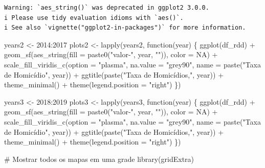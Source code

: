 \documentclass[
  letterpaper,
  DIV=11,
  numbers=noendperiod]{scrartcl}
\newenvironment{Shaded}{\begin{snugshade}}{\end{snugshade}}
\newcommand{\AttributeTok}[1]{\textcolor[rgb]{0.40,0.45,0.13}{#1}}
\newcommand{\CommentTok}[1]{\textcolor[rgb]{0.37,0.37,0.37}{#1}}
\newcommand{\ConstantTok}[1]{\textcolor[rgb]{0.56,0.35,0.01}{#1}}
\newcommand{\ControlFlowTok}[1]{\textcolor[rgb]{0.00,0.23,0.31}{#1}}
\newcommand{\DecValTok}[1]{\textcolor[rgb]{0.68,0.00,0.00}{#1}}
\newcommand{\FunctionTok}[1]{\textcolor[rgb]{0.28,0.35,0.67}{#1}}
\newcommand{\NormalTok}[1]{\textcolor[rgb]{0.00,0.23,0.31}{#1}}
\newcommand{\OtherTok}[1]{\textcolor[rgb]{0.00,0.23,0.31}{#1}}
\newcommand{\SpecialCharTok}[1]{\textcolor[rgb]{0.37,0.37,0.37}{#1}}
\newcommand{\StringTok}[1]{\textcolor[rgb]{0.13,0.47,0.30}{#1}}
\begin{document}
\begin{verbatim}
Warning: `aes_string()` was deprecated in ggplot2 3.0.0.
i Please use tidy evaluation idioms with `aes()`.
i See also `vignette("ggplot2-in-packages")` for more information.
\end{verbatim}

\begin{Shaded}
\begin{Highlighting}[]
\NormalTok{years2 }\OtherTok{\textless{}{-}} \DecValTok{2014}\SpecialCharTok{:}\DecValTok{2017}
\NormalTok{plots2 }\OtherTok{\textless{}{-}} \FunctionTok{lapply}\NormalTok{(years2, }\ControlFlowTok{function}\NormalTok{(year) \{}
  \FunctionTok{ggplot}\NormalTok{(df\_rdd) }\SpecialCharTok{+}
    \FunctionTok{geom\_sf}\NormalTok{(}\FunctionTok{aes\_string}\NormalTok{(}\AttributeTok{fill =} \FunctionTok{paste0}\NormalTok{(}\StringTok{"\textasciigrave{}valor{-}"}\NormalTok{, year, }\StringTok{"\textasciigrave{}"}\NormalTok{)), }\AttributeTok{color =} \ConstantTok{NA}\NormalTok{) }\SpecialCharTok{+}
    \FunctionTok{scale\_fill\_viridis\_c}\NormalTok{(}\AttributeTok{option =} \StringTok{"plasma"}\NormalTok{, }\AttributeTok{na.value =} \StringTok{"grey90"}\NormalTok{, }\AttributeTok{name =} \FunctionTok{paste}\NormalTok{(}\StringTok{"Taxa de Homicídio"}\NormalTok{, year)) }\SpecialCharTok{+}
    \FunctionTok{ggtitle}\NormalTok{(}\FunctionTok{paste}\NormalTok{(}\StringTok{"Taxa de Homicídios,"}\NormalTok{, year)) }\SpecialCharTok{+}
    \FunctionTok{theme\_minimal}\NormalTok{() }\SpecialCharTok{+}
    \FunctionTok{theme}\NormalTok{(}\AttributeTok{legend.position =} \StringTok{"right"}\NormalTok{)}
\NormalTok{\})}

\NormalTok{years3 }\OtherTok{\textless{}{-}} \DecValTok{2018}\SpecialCharTok{:}\DecValTok{2019}
\NormalTok{plots3 }\OtherTok{\textless{}{-}} \FunctionTok{lapply}\NormalTok{(years3, }\ControlFlowTok{function}\NormalTok{(year) \{}
  \FunctionTok{ggplot}\NormalTok{(df\_rdd) }\SpecialCharTok{+}
    \FunctionTok{geom\_sf}\NormalTok{(}\FunctionTok{aes\_string}\NormalTok{(}\AttributeTok{fill =} \FunctionTok{paste0}\NormalTok{(}\StringTok{"\textasciigrave{}valor{-}"}\NormalTok{, year, }\StringTok{"\textasciigrave{}"}\NormalTok{)), }\AttributeTok{color =} \ConstantTok{NA}\NormalTok{) }\SpecialCharTok{+}
    \FunctionTok{scale\_fill\_viridis\_c}\NormalTok{(}\AttributeTok{option =} \StringTok{"plasma"}\NormalTok{, }\AttributeTok{na.value =} \StringTok{"grey90"}\NormalTok{, }\AttributeTok{name =} \FunctionTok{paste}\NormalTok{(}\StringTok{"Taxa de Homicídio"}\NormalTok{, year)) }\SpecialCharTok{+}
    \FunctionTok{ggtitle}\NormalTok{(}\FunctionTok{paste}\NormalTok{(}\StringTok{"Taxa de Homicídios,"}\NormalTok{, year)) }\SpecialCharTok{+}
    \FunctionTok{theme\_minimal}\NormalTok{() }\SpecialCharTok{+}
    \FunctionTok{theme}\NormalTok{(}\AttributeTok{legend.position =} \StringTok{"right"}\NormalTok{)}
\NormalTok{\})}

\CommentTok{\# Mostrar todos os mapas em uma grade}
\FunctionTok{library}\NormalTok{(gridExtra)}
\end{Highlighting}
\end{Shaded}
\end{document}
